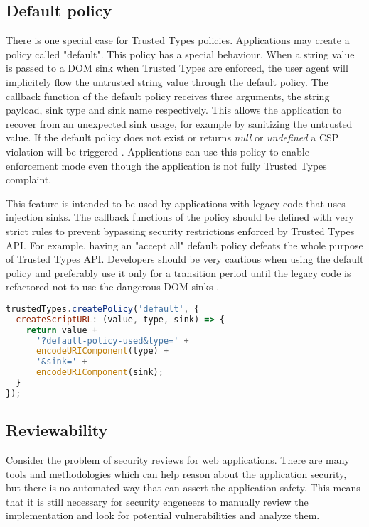 \subsection{Default policy}

There is one special case for Trusted Types policies. Applications may create a policy called
"default". This policy has a special behaviour. When a string value is passed to a DOM sink when
Trusted Types are enforced, the user agent will implicitely flow the untrusted string value through
the default policy. The callback function of the default policy receives three arguments, the string
payload, sink type and sink name respectively. This allows the application to recover from an
unexpected sink usage, for example by sanitizing the untrusted value. If the default policy does not
exist or returns \textit{null} or \textit{undefined} a CSP violation will be triggered
\cite{tt_spec:default_policy}. Applications can use this policy to enable enforcement mode even
though the application is not fully Trusted Types complaint.

This feature is intended to be used by applications with legacy code that uses injection sinks. The
callback functions of the policy should be defined with very strict rules to prevent bypassing
security restrictions enforced by Trusted Types API. For example, having an "accept all" default
policy defeats the whole purpose of Trusted Types API. Developers should be very cautious when using
the default policy and preferably use it only for a transition period until the legacy code is
refactored not to use the dangerous DOM sinks \cite{tt_spec:default_policy}.

\bigskip
\begin{lstlisting}[language=JavaScript, caption=Creating a default policy \cite{tt_spec:default_policy}]
trustedTypes.createPolicy('default', {
  createScriptURL: (value, type, sink) => {
    return value +
      '?default-policy-used&type=' +
      encodeURIComponent(type) +
      '&sink=' +
      encodeURIComponent(sink);
  }
});
\end{lstlisting}

\subsection{Reviewability}

Consider the problem of security reviews for web applications. There are many tools and methodologies
which can help reason about the application security, but there is no automated way that can assert
the application safety. This means that it is still necessary for security engeneers to manually
review the implementation and look for potential vulnerabilities and analyze them.

